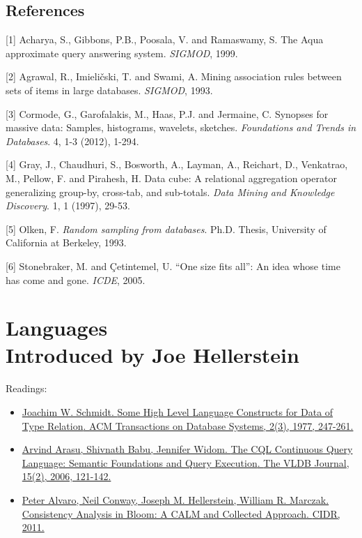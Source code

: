 \documentclass[b5paper,11pt,twoside,openright]{book}
\newcommand\Chapter[3]{
  \hypertarget{#1}{
    \chapter[#2]{#2\\{\Large #3}}
  }
}
\begin{document}
\section*{References}

\leavevmode\hypertarget{ref-aqua}{}%
{[}1{]} Acharya, S., Gibbons, P.B., Poosala, V. and Ramaswamy, S. The
Aqua approximate query answering system. \emph{SIGMOD}, 1999.

\leavevmode\hypertarget{ref-associationrules}{}%
{[}2{]} Agrawal, R., Imieličski, T. and Swami, A. Mining association
rules between sets of items in large databases. \emph{SIGMOD}, 1993.

\leavevmode\hypertarget{ref-fnt-sketch}{}%
{[}3{]} Cormode, G., Garofalakis, M., Haas, P.J. and Jermaine, C.
Synopses for massive data: Samples, histograms, wavelets, sketches.
\emph{Foundations and Trends in Databases}. 4, 1-3 (2012), 1-294.

\leavevmode\hypertarget{ref-gray-cube}{}%
{[}4{]} Gray, J., Chaudhuri, S., Bosworth, A., Layman, A., Reichart, D.,
Venkatrao, M., Pellow, F. and Pirahesh, H. Data cube: A relational
aggregation operator generalizing group-by, cross-tab, and sub-totals.
\emph{Data Mining and Knowledge Discovery}. 1, 1 (1997), 29-53.

\leavevmode\hypertarget{ref-olken-phd}{}%
{[}5{]} Olken, F. \emph{Random sampling from databases}. Ph.D. Thesis,
University of California at Berkeley, 1993.

\leavevmode\hypertarget{ref-onesize}{}%
{[}6{]} Stonebraker, M. and \c{C}etintemel, U. ``One size fits all'': An
idea whose time has come and gone. \emph{ICDE}, 2005.


\Chapter{ch9-languages}{%
Languages
}{%
Introduced by Joe Hellerstein
}

\begin{framed}
Readings:
\begin{itemize}
\item
\href{https://scholar.google.com/scholar?cluster=5934767222958591409}{Joachim
  W. Schmidt. {Some High Level Language Constructs for Data of Type
    Relation}. {ACM Transactions on Database Systems}, 2(3), 1977, 247-261.}
\item
\href{https://scholar.google.com/scholar?cluster=17215743948117955326}{Arvind
  Arasu, Shivnath Babu, Jennifer Widom. {The CQL Continuous Query
    Language: Semantic Foundations and Query Execution}. {The VLDB Journal},
  15(2), 2006, 121-142.}
\item
\href{https://scholar.google.com/scholar?cluster=9165311711752272482}{Peter
  Alvaro, Neil Conway, Joseph M. Hellerstein, William R. Marczak.
  {Consistency Analysis in Bloom: A CALM and Collected Approach}. {CIDR},
  2011.}
\end{itemize}
\end{framed}
\end{document}
